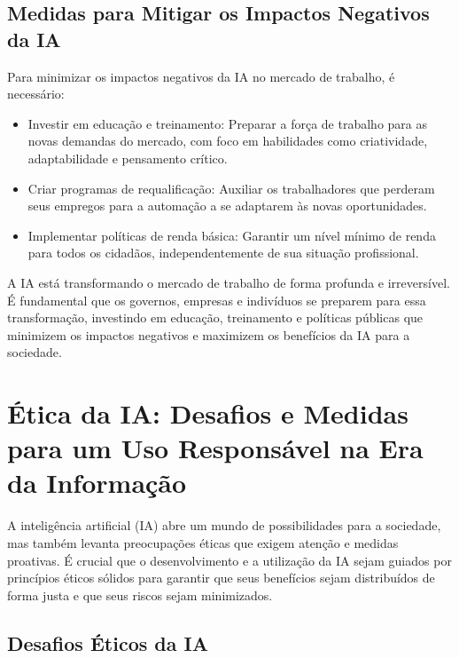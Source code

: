\documentclass[12pt,twoside]{book}
\begin{document}
\section{Medidas para Mitigar os Impactos Negativos da IA}

Para minimizar os impactos negativos da IA no mercado de trabalho, é necessário:
\begin{itemize}
    \item Investir em educação e treinamento: Preparar a força de trabalho para as novas demandas do mercado, com foco em habilidades como criatividade, adaptabilidade e pensamento crítico.
    \item Criar programas de requalificação: Auxiliar os trabalhadores que perderam seus empregos para a automação a se adaptarem às novas oportunidades.
    \item Implementar políticas de renda básica: Garantir um nível mínimo de renda para todos os cidadãos, independentemente de sua situação profissional.
\end{itemize}

A IA está transformando o mercado de trabalho de forma profunda e irreversível. É fundamental que os governos, empresas e indivíduos se preparem para essa transformação, investindo em educação, treinamento e políticas públicas que minimizem os impactos negativos e maximizem os benefícios da IA para a sociedade.

\chapter{Ética da IA: Desafios e Medidas para um Uso Responsável na Era da Informação}

A inteligência artificial (IA) abre um mundo de possibilidades para a sociedade, mas também levanta preocupações éticas que exigem atenção e medidas proativas. É crucial que o desenvolvimento e a utilização da IA sejam guiados por princípios éticos sólidos para garantir que seus benefícios sejam distribuídos de forma justa e que seus riscos sejam minimizados.

\section{Desafios Éticos da IA}
\end{document}
